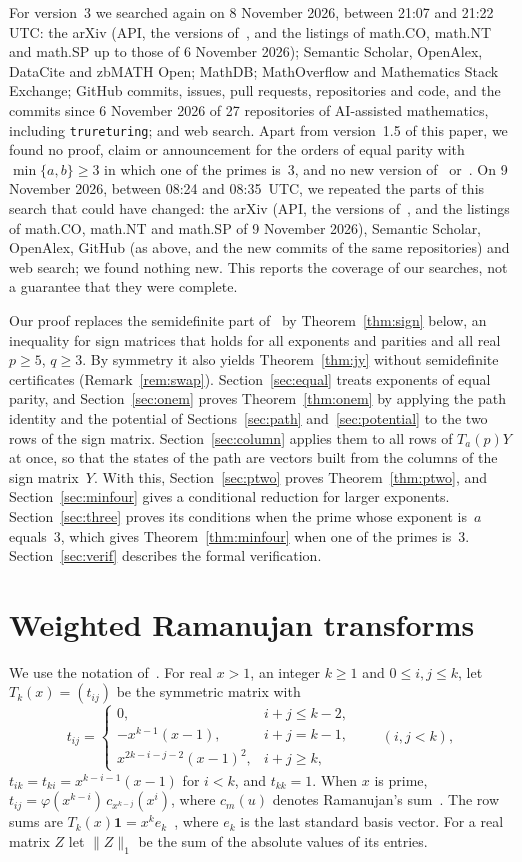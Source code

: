 \documentclass[11pt]{article}
\theoremstyle{remark}
\begin{document}
For version~3 we searched again on 8 November 2026, between 21:07 and 21:22 UTC:
the arXiv (API, the versions of~\cite{jy,jy2}, and the listings of math.CO, math.NT
and math.SP up to those of 6 November 2026); Semantic Scholar, OpenAlex, DataCite
and zbMATH Open; MathDB; MathOverflow and Mathematics Stack Exchange; GitHub
commits, issues, pull requests, repositories and code, and the commits since
6 November 2026 of 27 repositories of AI-assisted mathematics, including
\texttt{trureturing}; and web search. Apart from version~1.5 of this paper, we
found no proof, claim or announcement for the orders of equal parity with
$\min\{a,b\}\ge3$ in which one of the primes is~$3$, and no new version of~\cite{jy}
or~\cite{jy2}. On 9 November 2026, between 08:24 and 08:35~UTC, we repeated the
parts of this search that could have changed: the arXiv (API, the versions
of~\cite{jy,jy2}, and the listings of math.CO, math.NT and math.SP of 9 November
2026), Semantic Scholar, OpenAlex, GitHub (as above, and the new commits of the same
repositories) and web search; we found nothing new. This reports the coverage of our
searches, not a guarantee that they were complete.

Our proof replaces the semidefinite part of~\cite{jy} by
Theorem~\ref{thm:sign} below, an inequality for sign matrices that holds for
all exponents and parities and all real $p\ge5$, $q\ge3$. By symmetry it also
yields Theorem~\ref{thm:jy} without semidefinite certificates
(Remark~\ref{rem:swap}). Section~\ref{sec:equal} treats exponents of equal
parity, and Section~\ref{sec:onem} proves Theorem~\ref{thm:onem} by applying
the path identity and the potential of Sections~\ref{sec:path}
and~\ref{sec:potential} to the two rows of the sign matrix.
Section~\ref{sec:column} applies them to all rows of $T_a(p)Y$ at once, so
that the states of the path are vectors built from the columns of the sign
matrix~$Y$. With this, Section~\ref{sec:ptwo} proves Theorem~\ref{thm:ptwo},
and Section~\ref{sec:minfour} gives a conditional reduction for larger
exponents. Section~\ref{sec:three} proves its conditions when the prime whose
exponent is~$a$ equals~$3$, which gives Theorem~\ref{thm:minfour} when one of the
primes is~$3$. Section~\ref{sec:verif} describes the formal verification.

\section{Weighted Ramanujan transforms}
We use the notation of~\cite{jy}. For real $x>1$, an integer $k\ge1$ and
$0\le i,j\le k$, let $T_k(x)=(t_{ij})$ be the symmetric matrix with
\[
t_{ij}=\begin{cases}0,& i+j\le k-2,\\ -x^{k-1}(x-1),& i+j=k-1,\\
x^{2k-i-j-2}(x-1)^2,& i+j\ge k,\end{cases}\qquad (i,j<k),
\]
$t_{ik}=t_{ki}=x^{k-i-1}(x-1)$ for $i<k$, and $t_{kk}=1$. When $x$ is prime,
$t_{ij}=\varphi(x^{k-i})\,c_{x^{k-j}}(x^i)$, where $c_m(u)$ denotes
Ramanujan's sum~\cite[(2.2)--(2.4)]{jy}. The row sums are
$T_k(x)\mathbf 1=x^ke_k$~\cite[(2.5)]{jy}, where $e_k$ is the last standard
basis vector. For a real matrix $Z$ let $\|Z\|_1$ be the sum of the absolute
values of its entries.
\end{document}

